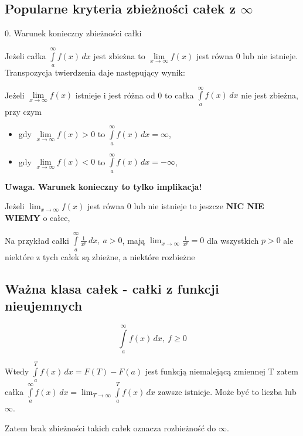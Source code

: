 \subsection*{Popularne kryteria zbieżności całek z $\infty$}

0. Warunek konieczny zbieżności całki

Jeżeli całka $ \int\limits_{a}^{\infty} f(x) \,dx $ jest zbieżna to 
$ \lim\limits_{x \to \infty} f(x) $ jest równa 0 lub nie istnieje. \\

Transpozycja twierdzenia daje następujący wynik:

Jeżeli $ \lim\limits_{x \to \infty} f(x) $ istnieje i jest różna od 0 to całka 
$ \int\limits_{a}^{\infty} f(x) \, dx $ nie jest zbieżna, przy czym

\begin{itemize}
    \item gdy $ \lim\limits_{x \to \infty} f(x) > 0 $ to $ \int\limits_{a}^{\infty} f(x) \,dx = \infty $,
    \item gdy $ \lim\limits_{x \to \infty} f(x) < 0 $ to $ \int\limits_{a}^{\infty} f(x) \,dx = -\infty $,
\end{itemize}

\textbf{Uwaga. Warunek konieczny to tylko implikacja!}

Jeżeli $ \lim_{x \to \infty} f(x) $ jest równa 0 lub nie istnieje to jeszcze \textbf{NIC NIE WIEMY} o całce,

Na przykład całki $ \int\limits_{a}^{\infty} \frac{1}{x^p} \,dx, \ a > 0 $, mają
$ \lim_{x \to \infty} \frac{1}{x^p} = 0 $ dla wszystkich $ p > 0 $ ale niektóre z tych całek są zbieżne,
a niektóre rozbieżne \\

\subsection*{Ważna klasa całek - całki z funkcji nieujemnych}

$$ \int\limits_{a}^{\infty} f(x) \,dx, \ f \geq 0 $$

Wtedy $ \int\limits_{a}^{T} f(x) \, dx = F(T) - F(a) $ jest funkcją niemalejącą zmiennej T zatem całka
$ \int\limits_{a}^{\infty} f(x) \, dx = \lim_{T \to \infty} \int\limits_{a}^{T} f(x) \,dx $
zawsze istnieje. Może być to liczba lub $\infty$.

Zatem brak zbieżności takich całek oznacza rozbieżność do $\infty$. \\

